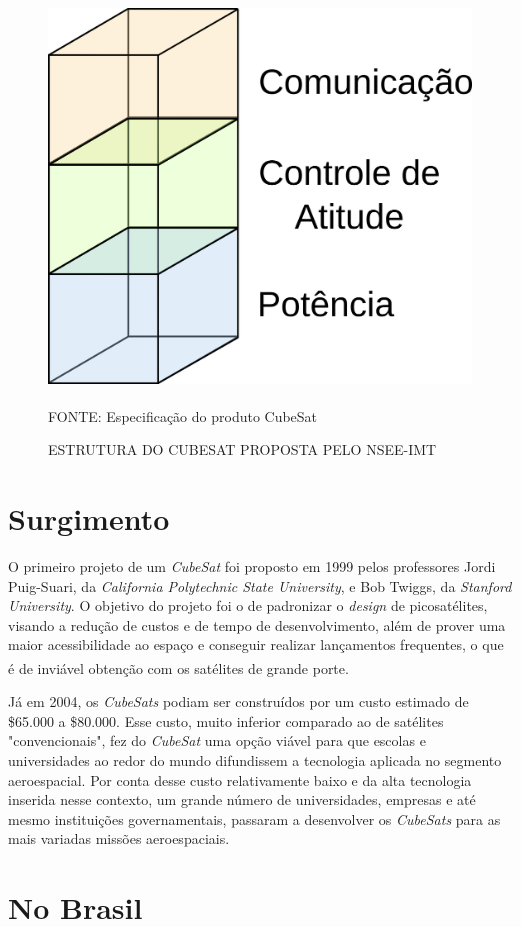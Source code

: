 \documentclass[
	12pt,				%
	openright,			%
	oneside,			%
	a4paper,			%
	english,			%
	french,				%
	spanish,			%
	brazil,				%
	oldfontcommands
	]{abntex2}
\begin{document}
	\begin{figure}[th]
		\caption{ESTRUTURA DO CUBESAT PROPOSTA PELO NSEE-IMT}
		\label{Fig_Est_Cubo}
		\centering
		\includegraphics[width=0.4\linewidth]{./figs/cubesat_02}
			
		\begin{small}
			FONTE: Especificação do produto CubeSat\textsuperscript{\cite{Corsi}}
		\end{small}		
	\end{figure}
	\pagebreak

\section[Surgimento]{Surgimento} 

	O primeiro projeto de um \textit{CubeSat} foi proposto em 1999 pelos professores Jordi Puig-Suari, da \textit{California Polytechnic State University}, e Bob Twiggs, da \textit{Stanford University}. O objetivo do projeto foi o de padronizar o \textit{design} de picosatélites, visando a redução de custos e de tempo de desenvolvimento, além de prover uma maior acessibilidade ao espaço e conseguir realizar lançamentos frequentes, o que é de inviável obtenção com os satélites de grande porte.\textsuperscript{\cite{CubeSat}}
	
	Já em 2004, os \textit{CubeSats} podiam ser construídos por um custo estimado de \$65.000 a \$80.000. Esse custo, muito inferior comparado ao de satélites "convencionais", fez do \textit{CubeSat} uma opção viável para que escolas e universidades ao redor do mundo difundissem a tecnologia aplicada no segmento aeroespacial. Por conta desse custo relativamente baixo e da alta tecnologia inserida nesse contexto, um grande número de universidades, empresas e até mesmo instituições governamentais, passaram a desenvolver os \textit{CubeSats} para as mais variadas missões aeroespaciais.

\section[No Brasil]{No Brasil}
\end{document}
